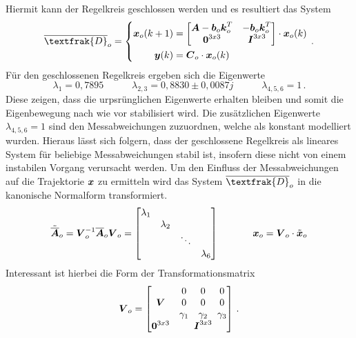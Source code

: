 Hiermit kann der Regelkreis geschlossen werden und es resultiert das System
\begin{equation}
\overline{\textfrak{D}}_o = \left\{ \begin{split}
\bs{x}_o(k+1) &= \begin{bmatrix}
\bs{A}-\bs{b}_o\bs{k}^T_o & -\bs{b}_o\bs{k}^T_o \\
\bs{0}^{3x3} & \bs{I}^{3x3}
\end{bmatrix}\cdot \bs{x}_o(k)
\\
\bs{y}(k) &= \bs{C}_o\cdot \bs{x}_o(k)
\end{split}\right.
\,.
\end{equation}
Für den geschlossenen Regelkreis ergeben sich die Eigenwerte
\begin{equation}
\lambda_1 = 0,7895 \hspace{35pt} \lambda_{2,3} = 0,8830 \pm 0,0087j \hspace{35pt} \lambda_{4,5,6} = 1
\,.
\end{equation}
Diese zeigen, dass die urpsrünglichen Eigenwerte erhalten bleiben und somit die Eigenbewegung nach wie vor stabilisiert wird. Die zusätzlichen Eigenwerte $\lambda_{4,5,6}=1$ sind den Messabweichungen zuzuordnen, welche als konstant modelliert wurden. Hieraus lässt sich folgern, dass der geschlossene Regelkreis als lineares System für beliebige Messabweichungen stabil ist, insofern diese nicht von einem instabilen Vorgang verursacht werden. Um den Einfluss der Messabweichungen auf die Trajektorie $\boldsymbol{x}$ zu ermitteln wird das System $\overline{\textfrak{D}}_o$ in die kanonische Normalform transformiert.
\begin{equation}
\tilde{\overline{\boldsymbol{A}}}_o = \boldsymbol{V}^{-1}_o\overline{\boldsymbol{A}}_o\boldsymbol{V}_o = \begin{bmatrix}
\lambda_1 & & & \\
 & \lambda_2 & & \\
 & & \ddots & \\
 & & & \lambda_6
\end{bmatrix}
\hspace{35pt} 
\boldsymbol{x}_o = \boldsymbol{V}_o\cdot \tilde{\boldsymbol{x}}_o
\end{equation}
Interessant ist hierbei die Form der Transformationsmatrix
\begin{equation}
\boldsymbol{V}_o = \begin{bmatrix}
\boldsymbol{V} & \begin{matrix} 0 & 0 & 0 \\ 0 & 0 & 0 \\ \gamma_1 & \gamma_2 & \gamma_3 \end{matrix} 
\\ \boldsymbol{0}^{3x3} & \boldsymbol{I}^{3x3}
\end{bmatrix}
\,.
\end{equation}
